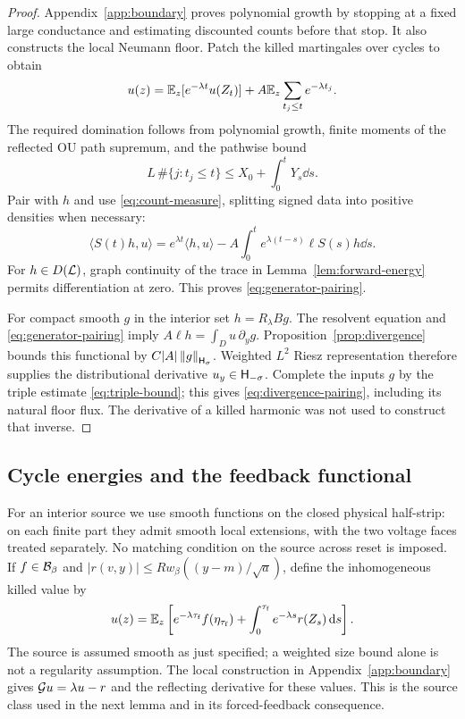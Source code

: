 \begin{proof}
Appendix~\ref{app:boundary} proves polynomial growth by stopping at a
fixed large conductance and estimating discounted counts before that
stop. It also constructs the local Neumann floor. Patch the killed
martingales over cycles to obtain
\[
 u(z)=\mathbb E_z[e^{-\lambda t}u(Z_t)]
                 +A\mathbb E_z\sum_{t_j\le t}e^{-\lambda t_j}.
\]
The required domination follows from polynomial growth, finite moments
of the reflected OU path supremum, and the pathwise bound
\begin{equation}\label{eq:count-bound}
 L\,\#\{j:t_j\le t\}\le X_0+\int_0^tY_s\dd s.
\end{equation}
Pair with $h$ and use \eqref{eq:count-measure}, splitting signed data
into positive densities when necessary:
\[
 \langle S(t)h,u\rangle=e^{\lambda t}\langle h,u\rangle
   -A\int_0^t e^{\lambda(t-s)}\ell S(s)h\dd s.
\]
For $h\in D(\mathcal L)$, graph continuity of the trace in
Lemma~\ref{lem:forward-energy} permits differentiation at zero.
This proves \eqref{eq:generator-pairing}.

For compact smooth $g$ in the interior set $h=R_\lambda Bg$.
The resolvent equation and \eqref{eq:generator-pairing} imply
$A\ell h=\int_Du\,\partial_y g$. Proposition~\ref{prop:divergence}
bounds this functional by $C|A|\left\|g\right\|_{\mathsf H_\sigma}$.
Weighted $L^2$ Riesz representation therefore supplies the
distributional derivative $u_y\in\mathsf H_{-\sigma}$. Complete the inputs
$g$ by the triple estimate \eqref{eq:triple-bound}; this gives
\eqref{eq:divergence-pairing}, including its natural floor flux.
The derivative of a killed harmonic was not used to construct that
inverse.
\end{proof}

\subsection{Cycle energies and the feedback functional}

For an interior source we use smooth functions on the closed physical
half-strip: on each finite part they admit smooth local extensions,
with the two voltage faces treated separately. No matching condition
on the source across reset is imposed. If $f\in\mathcal B_\beta$ and
$|r(v,y)|\le Rw_\beta((y-m)/\sqrt a)$, define the inhomogeneous killed value by
\[
 u(z)=\mathbb E_z\left[e^{-\lambda{\tau_{\mathrm f}}}f(\eta_{\tau_{\mathrm f}})
                    +\int_0^{\tau_{\mathrm f}} e^{-\lambda s}r(Z_s)\,\mathrm d s\right].
\]
The source is assumed smooth as just specified; a weighted size bound
alone is not a regularity assumption. The local construction in
Appendix~\ref{app:boundary} gives $\mathcal G u=\lambda u-r$ and the
reflecting derivative for these values. This is the source class
used in the next lemma and in its forced-feedback consequence.

